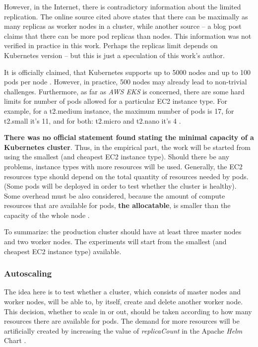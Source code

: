However, in the Internet, there is contradictory information about the limited replication. The online source cited above \cite{kubernetes-node-size} states that there can be maximally as many replicas as worker nodes in a cluster, while another source -- a blog post \cite{learnk8s-ll} claims that there can be more pod replicas than nodes. This information was not verified in practice in this work. Perhaps the replicas limit depends on Kubernetes version -- but this is just a speculation of this work's author.

It is officially claimed, that Kubernetes supports up to 5000 nodes and up to 100 pods per node \cite{kubernetes-large,kubernetes-node-size}. However, in practice, 500 nodes may already lead to non-trivial challenges. Furthermore, as far as \textit{AWS EKS} is concerned, there are some hard limits for number of pods allowed for a particular EC2 instance type. For example, for a t2.medium instance, the maximum number of pods is 17, for t2.small it's 11, and for both: t2.micro and t2.nano it's 4 \cite{eks-hard-limits,kubernetes-node-size}.

\textbf{There was no official statement found stating the minimal capacity of a Kubernetes cluster}. Thus, in the empirical part, the work will be started from using the smallest (and cheapest EC2 instance type). Should there be any problems, instance types with more resources will be used. Generally, the EC2 resources type should depend on the total quantity of resources needed by pods. (Some pods will be deployed in order to test whether the cluster is healthy). Some overhead must be also considered, because the amount of compute resources that are available for pods, \textbf{the allocatable}, is smaller than the capacity of the whole node \cite{k8s-alloc}.

To summarize: the production cluster should have at least three master nodes and two worker nodes. The experiments will start from the smallest (and cheapest EC2 instance type) available.

\subsubsection{Autoscaling}

The idea here is to test whether a cluster, which consists of master nodes and worker nodes, will be able to, by itself, create and delete another worker node. This decision, whether to scale in or out, should be taken according to how many resources there are available for pods. The demand for more resources will be artificially created by increasing the value of \textit{replicaCount} in the Apache \textit{Helm} Chart \cite{helm-apache}.


